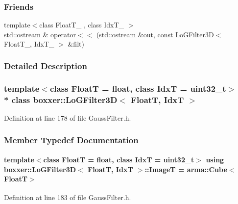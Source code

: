 \subsubsection*{Friends}
\begin{DoxyCompactItemize}
\item 
{\footnotesize template$<$class Float\+T\+\_\+ , class Idx\+T\+\_\+ $>$ }\\std\+::ostream \& \hyperlink{classboxxer_1_1LoGFilter3D_ae45bb5dbe9dc918aaaa8b484f5d63ce5}{operator$<$$<$} (std\+::ostream \&out, const \hyperlink{classboxxer_1_1LoGFilter3D}{Lo\+G\+Filter3D}$<$ Float\+T\+\_\+, Idx\+T\+\_\+ $>$ \&filt)
\end{DoxyCompactItemize}


\subsubsection{Detailed Description}
\subsubsection*{template$<$class FloatT = float, class IdxT = uint32\+\_\+t$>$\\*
class boxxer\+::\+Lo\+G\+Filter3\+D$<$ Float\+T, Idx\+T $>$}



Definition at line 178 of file Gauss\+Filter.\+h.



\subsubsection{Member Typedef Documentation}
\paragraph[{\texorpdfstring{ImageT}{ImageT}}]{\setlength{\rightskip}{0pt plus 5cm}template$<$class FloatT  = float, class IdxT  = uint32\+\_\+t$>$ using {\bf boxxer\+::\+Lo\+G\+Filter3D}$<$ FloatT, IdxT $>$\+::{\bf ImageT} =  arma\+::\+Cube$<$FloatT$>$}\hypertarget{classboxxer_1_1LoGFilter3D_a735a23ffea030e730398d32a49d2b223}{}\label{classboxxer_1_1LoGFilter3D_a735a23ffea030e730398d32a49d2b223}


Definition at line 183 of file Gauss\+Filter.\+h.

